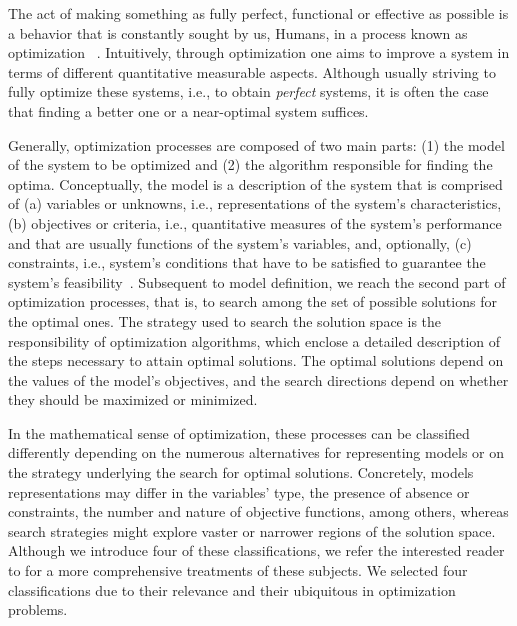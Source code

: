 \cleardoublepage
\label{chap:intro}

	The act of making something as fully perfect, functional or effective as possible is a behavior that is constantly sought by us, Humans, in a process known as optimization ~\cite{MerriamWebster2017OptimizationDefinition}. Intuitively, through optimization one aims to improve a system in terms of different quantitative measurable aspects. Although usually striving to fully optimize these systems, i.e., to obtain \textit{perfect} systems, it is often the case that finding a better one or a near-optimal system suffices.

	Generally, optimization processes are composed of two main parts: (1) the model of the system to be optimized and (2) the algorithm responsible for finding the optima. Conceptually, the model is a description of the system that is comprised of (a) variables or unknowns, i.e., representations of the system's characteristics, (b) objectives or criteria, i.e., quantitative measures of the system's performance and that are usually functions of the system's variables, and, optionally, (c) constraints, i.e., system's conditions that have to be satisfied to guarantee the system's feasibility~\cite{Nocedal2011NumericalOptimization}. Subsequent to model definition, we reach the second part of optimization processes, that is, to search among the set of possible solutions for the optimal ones. The strategy used to search the solution space is the responsibility of optimization algorithms, which enclose a detailed description of the steps necessary to attain optimal solutions. The optimal solutions depend on the values of the model's objectives, and the search directions depend on whether they should be maximized or minimized. 
	
	In the mathematical sense of optimization, these processes can be classified differently depending on the numerous alternatives for representing models or on the strategy underlying the search for optimal solutions. Concretely, models representations may differ in the variables' type, the presence of absence or constraints, the number and nature of objective functions, among others, whereas search strategies might explore vaster or narrower regions of the solution space. Although we introduce four of these classifications, we refer the interested reader to \cite{Nocedal2011NumericalOptimization,Nemhauser1988} for a more comprehensive treatments of these subjects. We selected four classifications due to their relevance and their ubiquitous in optimization problems.
	

